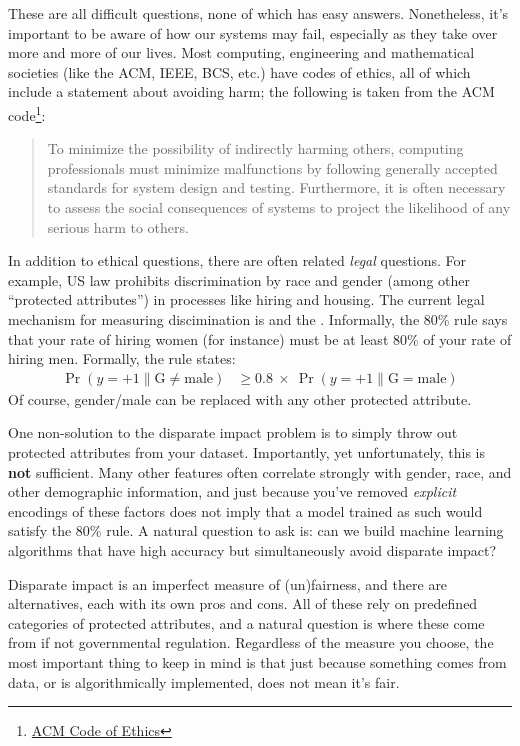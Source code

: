 These are all difficult questions, none of which has easy answers.
Nonetheless, it's important to be aware of how our systems may fail, especially as they take over more and more of our lives.
Most computing, engineering and mathematical societies (like the ACM, IEEE, BCS, etc.) have codes of ethics, all of which include a statement about avoiding harm; the following is taken from the ACM code\footnote{\href{https://www.acm.org/about-acm/acm-code-of-ethics-and-professional-conduct}{ACM Code of Ethics}}:
\begin{quote}
  To minimize the possibility of indirectly harming others, computing professionals must minimize malfunctions by following generally accepted standards for system design and testing. Furthermore, it is often necessary to assess the social consequences of systems to project the likelihood of any serious harm to others.
\end{quote}

In addition to ethical questions, there are often related \emph{legal} questions.
For example, US law prohibits discrimination by race and gender (among other ``protected attributes'') in processes like hiring and housing.
The current legal mechanism for measuring discimination is  and the .
Informally, the 80\% rule says that your rate of hiring women (for instance) must be at least 80\% of your rate of hiring men.
Formally, the rule states:
\begin{align}
                    \Pr(y = +1 \| \text{G} \neq \text{male})
& \geq 0.8 ~\times~ \Pr(y = +1 \| \text{G} =    \text{male})
\end{align}
Of course, gender/male can be replaced with any other protected attribute.

One non-solution to the disparate impact problem is to simply throw out protected attributes from your dataset.
Importantly, yet unfortunately, this is \textbf{not} sufficient.
Many other features often correlate strongly with gender, race, and other demographic information, and just because you've removed \emph{explicit} encodings of these factors does not imply that a model trained as such would satisfy the 80\% rule.
A natural question to ask is: can we build machine learning algorithms that have high accuracy but simultaneously avoid disparate impact?

Disparate impact is an imperfect measure of (un)fairness, and there are alternatives, each with its own pros and cons.
All of these rely on predefined categories of protected attributes, and a natural question is where these come from if not governmental regulation.
Regardless of the measure you choose, the most important thing to keep in mind is that just because something comes from data, or is algorithmically implemented, does not mean it's fair.


